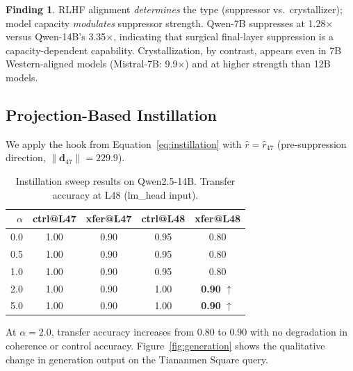 \documentclass[12pt]{article}
\theoremstyle{definition}
\newtheorem{finding}{Finding}
\begin{document}
\begin{finding}
RLHF alignment \emph{determines} the type (suppressor vs.\ crystallizer); model capacity
\emph{modulates} suppressor strength. Qwen-7B suppresses at 1.28$\times$ versus Qwen-14B's
3.35$\times$, indicating that surgical final-layer suppression is a capacity-dependent
capability. Crystallization, by contrast, appears even in 7B Western-aligned models
(Mistral-7B: 9.9$\times$) and at higher strength than 12B models.
\end{finding}

\subsection{Projection-Based Instillation}
\label{sec:instillation}

We apply the hook from Equation~\ref{eq:instillation} with $\hat{r} = \hat{r}_{47}$
(pre-suppression direction, $\|\mathbf{d}_{47}\| = 229.9$).

\begin{table}[H]
\centering
\caption{Instillation sweep results on Qwen2.5-14B. Transfer accuracy at L48 (lm\_head input).}
\label{tab:instill_sweep}
\begin{tabular}{rcccc}
\toprule
$\alpha$ & ctrl@L47 & xfer@L47 & ctrl@L48 & xfer@L48 \\
\midrule
0.0 & 1.00 & 0.90 & 0.95 & 0.80 \\
0.5 & 1.00 & 0.90 & 0.95 & 0.80 \\
1.0 & 1.00 & 0.90 & 0.95 & 0.80 \\
2.0 & 1.00 & 0.90 & 1.00 & \textbf{0.90} $\uparrow$ \\
5.0 & 1.00 & 0.90 & 1.00 & \textbf{0.90} $\uparrow$ \\
\bottomrule
\end{tabular}
\end{table}

At $\alpha = 2.0$, transfer accuracy increases from 0.80 to 0.90 with no degradation
in coherence or control accuracy. Figure~\ref{fig:generation} shows the qualitative
change in generation output on the Tiananmen Square query.
\end{document}

